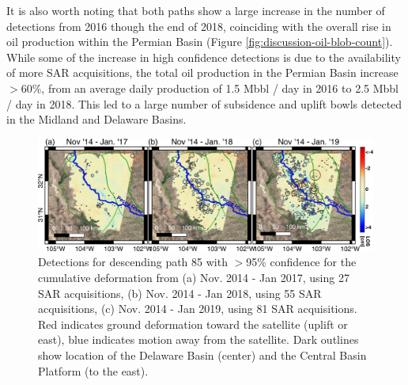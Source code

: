 \documentclass{utexasthesis}
\begin{document}
It is also worth noting that both paths show a large increase in the number of detections from 2016 though the end of 2018, coinciding with the overall rise in oil production within the Permian Basin (Figure \ref{fig:discussion-oil-blob-count}). While some of the increase in high confidence detections is due to the availability of more SAR acquisitions, the total oil production in the Permian Basin increase  $>60\%$, from an average daily production of 1.5 Mbbl / day in 2016 to 2.5 Mbbl / day in 2018. This led to a large number of subsidence and uplift bowls detected in the Midland and Delaware Basins.



\begin{figure}[hbt!]
\centering 
\includegraphics[width=0.98\linewidth]{paper2/figures/figure_discussion_blobs_combined_path85.png}
\caption{
Detections for descending path 85 with $ > $95\% confidence for the cumulative deformation from (a) Nov. 2014 - Jan 2017, using 27 SAR acquisitions, (b) Nov. 2014 - Jan 2018, using 55 SAR acquisitions,  (c) Nov. 2014 - Jan 2019, using 81 SAR acquisitions. Red indicates ground deformation toward the satellite (uplift or east), blue indicates motion away from the satellite. Dark outlines show location of the Delaware Basin (center) and the Central Basin Platform (to the east).
}
\label{fig:discussion-detections-85}
\end{figure}
\end{document}
